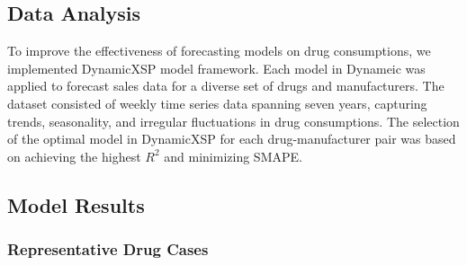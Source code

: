 \documentclass[journal]{IEEEtran}
\begin{document}
\subsection{Data Analysis}

To improve the effectiveness of forecasting models on drug consumptions, we implemented DynamicXSP model framework. Each model in Dynameic was applied to forecast sales data for a diverse set of drugs and manufacturers. The dataset consisted of weekly time series data spanning seven years, capturing trends, seasonality, and irregular fluctuations in drug consumptions. The selection of the optimal model in DynamicXSP for each drug-manufacturer pair was based on achieving the highest $R^2$ and minimizing SMAPE. 

\subsection{Model Results}
\subsubsection{Representative Drug Cases}
\end{document}
